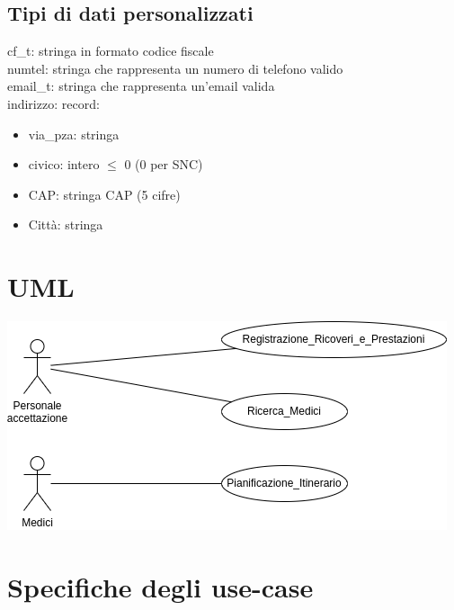 \documentclass[a4paper,12pt]{report}
\begin{document}
      \section{Tipi di dati personalizzati}
        cf\_t: stringa in formato codice fiscale \\
        numtel: stringa che rappresenta un numero di telefono valido \\
        email\_t: stringa che rappresenta un'email valida \\
        indirizzo: record:
        \begin{itemize}
          \item via\_pza: stringa
          \item civico: intero $\leq$ 0 (0 per SNC)
          \item CAP: stringa CAP (5 cifre)
          \item Città: stringa
        \end{itemize}

    \chapter{UML}
      \begin{center}
        \includegraphics{uml.png}
      \end{center}

    \chapter{Specifiche degli use-case}
\end{document}
